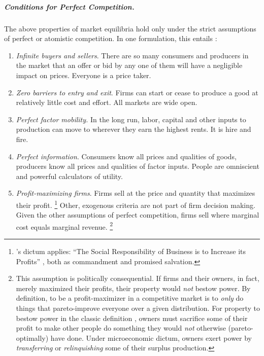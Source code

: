 \subparagraph[Perfect Competition]{Conditions for Perfect Competition.}
	\label{sec:perfect-competition}
The above properties of market equilibria hold only under the strict assumptions of perfect or atomistic competition.
In one formulation, this entails \citep[157f.]{McDowell2006}:

\begin{enumerate}
	\item \emph{Infinite buyers and sellers}.
		\label{itm:infinite-buyers-sellers}
	There are so many consumers and producers in the market that an offer or bid by any one of them will have a negligible impact on prices.
	Everyone is a price taker.

	\item \emph{Zero barriers to entry and exit}.
		\label{itm:easy-entry-exit}
	Firms can start or cease to produce a good at relatively little cost and effort.
	All markets are wide open.

	\item \emph{Perfect factor mobility.}
		\label{itm:perfect-factor-mobility}
	In the long run, labor, capital and other inputs to production can move to wherever they earn the highest rents.
	It is hire and fire.

	\item \emph{Perfect information}.
		\label{itm:perfect-information}
	Consumers know all prices and qualities of goods, producers know all prices and qualities of factor inputs.
	People are omniscient and powerful calculators of utility.

	\item \emph{Profit-maximizing firms}.
		\label{itm:profit-maximizing-firms}
	Firms sell at the price and quantity that maximizes their profit.
	\footnote{
		\citeauthor{Friedman1970a}'s dictum applies:
		``The Social Responsibility of Business is to Increase its Profits'' \citeyearpar{Friedman1970a}, both as commandment and promised salvation.
	}
	Other, exogenous criteria are not part of firm decision making.
	Given the other assumptions of perfect competition, firms sell where marginal cost equals marginal revenue.
	\footnote{
		This assumption is politically consequential.
		If firms and their owners, in fact, merely maximized their profits, their property would \emph{not} bestow power.
		By definition, to be a profit-maximizer in a competitive market is to \emph{only} do things that pareto-improve everyone over a given distribution.
		For property to bestow power in the classic definition \citep[8ff]{Geoff2002}, owners must sacrifice some of their profit to make other people do something they would \emph{not} otherwise (pareto-optimally) have done.
		Under microeconomic dictum, owners exert power by \emph{transferring} or \emph{relinquishing} some of their surplus production.

}
\end{enumerate}
